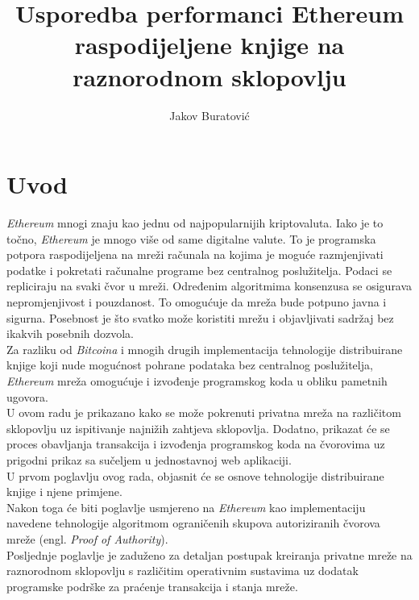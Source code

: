 \documentclass[times, utf8, zavrsni, numeric]{fer}
\begin{document}

\title{Usporedba performanci Ethereum raspodijeljene knjige na raznorodnom sklopovlju}

\author{Jakov Buratović}

\maketitle



\tableofcontents

\chapter{Uvod}
\emph{Ethereum} mnogi znaju kao jednu od najpopularnijih kriptovaluta. Iako je to točno, \emph{Ethereum} je mnogo
više od same digitalne valute. To je programska potpora raspodijeljena na mreži računala na kojima je
moguće razmjenjivati podatke i pokretati računalne programe bez centralnog poslužitelja. 
Podaci se repliciraju na svaki čvor u mreži. Određenim algoritmima konsenzusa se osigurava 
nepromjenjivost i pouzdanost. 
To omogućuje da mreža bude potpuno javna i sigurna. Posebnost je što svatko može koristiti
mrežu i objavljivati sadržaj bez ikakvih posebnih dozvola. \\ Za razliku od \emph{Bitcoina}
i mnogih drugih implementacija tehnologije distribuirane knjige koji nude mogućnost pohrane podataka
bez centralnog poslužitelja, \emph{Ethereum} mreža omogućuje i izvođenje programskog koda u obliku pametnih ugovora.\\
U ovom radu je prikazano kako se može pokrenuti privatna mreža na različitom sklopovlju uz  ispitivanje najnižih zahtjeva sklopovlja.
Dodatno, prikazat će se proces obavljanja transakcija i izvođenja programskog koda na čvorovima uz prigodni prikaz sa sučeljem u jednostavnoj web aplikaciji.\\
U prvom poglavlju ovog rada, objasnit će se osnove tehnologije distribuirane knjige i njene primjene.\\
Nakon toga će biti poglavlje usmjereno na \emph{Ethereum} kao implementaciju navedene tehnologije algoritmom ograničenih skupova autoriziranih čvorova mreže (engl. \emph{Proof of Authority}). \\
Posljednje poglavlje je zaduženo za detaljan postupak kreiranja privatne mreže na raznorodnom sklopovlju
s različitim operativnim sustavima uz dodatak programske podrške za praćenje transakcija i stanja mreže.  
\end{document}
